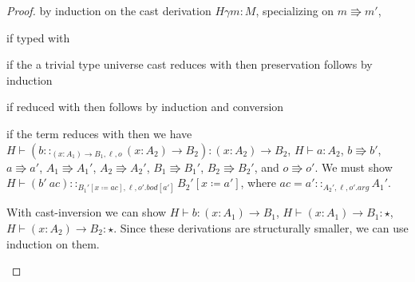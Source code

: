 \begin{proof}
  by induction on the cast derivation $H\gamma m:M$, specializing on $m\Rrightarrow m'$,

\begin{casenv}
  \item if typed with 
  \begin{casenv}
    \item if the a trivial type universe cast reduces with  then preservation follows by induction
    \item if reduced with  then follows by induction and conversion
  \end{casenv}
  \item {}
  \begin{casenv}
    \item if the term reduces with  then we have
    $H\vdash\left(b::_{\left(x:A_{1}\right)\rightarrow B_{1},\ell ,o}\left(x:A_{2}\right)\rightarrow B_{2}\right):\left(x:A_{2}\right)\rightarrow B_{2}$,
    $H\vdash a:A_{2}$,
    $b\Rrightarrow b'$, $a\Rrightarrow a'$, $A_{1}\Rrightarrow A_{1}'$,
    $A_{2}\Rrightarrow A_{2}'$, $B_{1}\Rrightarrow B_{1}'$,  $B_{2}\Rrightarrow B_{2}'$,
    and $o\Rrightarrow o'$.
    We must show $H\vdash\left(b'\ ac\right)::_{B_{1}'\left[x\coloneqq ac\right],\ell ,o'.bod[a']}B_{2}'\left[x\coloneqq a'\right]$, where $ac=a'::_{A_{2}',\ell,o'.arg}A_{1}'$.
    
    With cast-inversion we can show $H\vdash b:\left(x:A_{1}\right)\rightarrow B_{1}$, $H\vdash\left(x:A_{1}\right)\rightarrow B_{1}:\star$,
    $H\vdash\left(x:A_{2}\right)\rightarrow B_{2}:\star$.
    Since these derivations are structurally smaller, we can use induction on them.


\end{casenv}
\end{casenv}
\end{proof}

